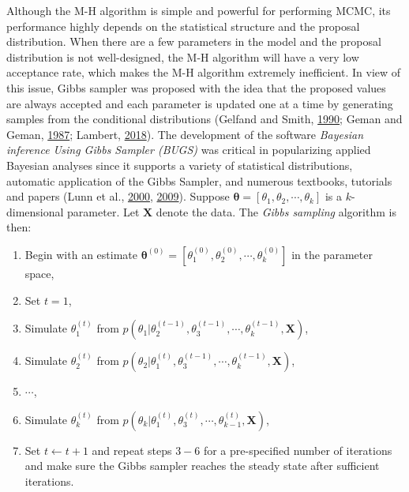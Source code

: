 \documentclass[12pt]{book}
\numberwithin{equation}{chapter}
\providecommand{\tightlist}{%
  \setlength{\itemsep}{0pt}\setlength{\parskip}{0pt}}
\begin{document}
Although the M-H algorithm is simple and powerful for performing MCMC, its performance highly depends on the statistical structure and the proposal distribution. When there are a few parameters in the model and the proposal distribution is not well-designed, the M-H algorithm will have a very low acceptance rate, which makes the M-H algorithm extremely inefficient. In view of this issue, Gibbs sampler was proposed with the idea that the proposed values are always accepted and each parameter is updated one at a time by generating samples from the conditional distributions (Gelfand and Smith, \protect\hyperlink{ref-gelfand1990sampling}{1990}; Geman and Geman, \protect\hyperlink{ref-geman1987stochastic}{1987}; Lambert, \protect\hyperlink{ref-lambert2018student}{2018}). The development of the software \emph{Bayesian inference Using Gibbs Sampler (BUGS)} was critical in popularizing applied Bayesian analyses since it supports a variety of statistical distributions, automatic application of the Gibbs Sampler, and numerous textbooks, tutorials and papers (Lunn et al., \protect\hyperlink{ref-lunn2000winbugs}{2000}, \protect\hyperlink{ref-lunn2009bugs}{2009}). Suppose \(\mathbf{\theta} = [\theta_1, \theta_2, \cdots, \theta_k]\) is a \(k\)-dimensional parameter. Let \(\mathbf{X}\) denote the data. The \emph{Gibbs sampling} algorithm is then:

\begin{enumerate}
\def\labelenumi{\arabic{enumi}.}
\tightlist
\item
  Begin with an estimate \(\mathbf{\theta}^{(0)} = [\theta_1^{(0)}, \theta_2^{(0)}, \cdots , \theta_k^{(0)}]\) in the parameter space,
\item
  Set \(t = 1\),
\item
  Simulate \(\theta_1^{(t)}\) from \(p(\theta_1|\theta_2^{(t-1)}, \theta_3^{(t-1)},\cdots , \theta_k^{(t-1)}, \mathbf{X})\),
\item
  Simulate \(\theta_2^{(t)}\) from \(p(\theta_2|\theta_1^{(t)}, \theta_3^{(t-1)},\cdots , \theta_k^{(t-1)}, \mathbf{X})\),
\item
  \(\cdots\),
\item
  Simulate \(\theta_k^{(t)}\) from \(p(\theta_k|\theta_1^{(t)}, \theta_3^{(t)},\cdots , \theta_{k-1}^{(t)}, \mathbf{X})\),
\item
  Set \(t \leftarrow t + 1\) and repeat steps \(3-6\) for a pre-specified number of iterations and make sure the Gibbs sampler reaches the steady state after sufficient iterations.
\end{enumerate}
\end{document}

